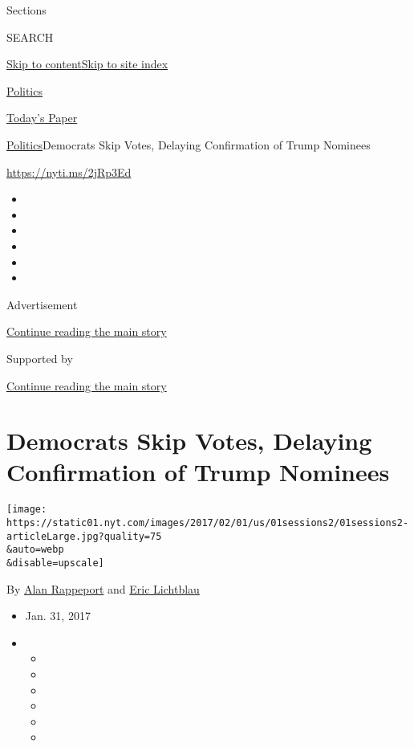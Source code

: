 Sections

SEARCH

\protect\hyperlink{site-content}{Skip to
content}\protect\hyperlink{site-index}{Skip to site index}

\href{https://www.nytimes.com/section/politics}{Politics}

\href{https://myaccount.nytimes.com/auth/login?response_type=cookie\&client_id=vi}{}

\href{https://www.nytimes.com/section/todayspaper}{Today's Paper}

\href{/section/politics}{Politics}\textbar{}Democrats Skip Votes,
Delaying Confirmation of Trump Nominees

\url{https://nyti.ms/2jRp3Ed}

\begin{itemize}
\item
\item
\item
\item
\item
\item
\end{itemize}

Advertisement

\protect\hyperlink{after-top}{Continue reading the main story}

Supported by

\protect\hyperlink{after-sponsor}{Continue reading the main story}

\hypertarget{democrats-skip-votes-delaying-confirmation-of-trump-nominees}{%
\section{Democrats Skip Votes, Delaying Confirmation of Trump
Nominees}\label{democrats-skip-votes-delaying-confirmation-of-trump-nominees}}

\texttt{[image: https://static01.nyt.com/images/2017/02/01/us/01sessions2/01sessions2-articleLarge.jpg?quality=75\\\&auto=webp\\\&disable=upscale]}

By \href{https://www.nytimes.com/by/alan-rappeport}{Alan Rappeport} and
\href{http://www.nytimes.com/by/eric-lichtblau}{Eric Lichtblau}

\begin{itemize}
\item
  Jan. 31, 2017
\item
  \begin{itemize}
  \item
  \item
  \item
  \item
  \item
  \item
  \end{itemize}
\end{itemize}

